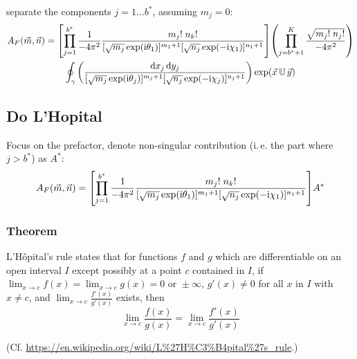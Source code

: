 \documentclass[
	english,
	a4paper,
	fontsize=10pt,
	parskip=half,
	titlepage=true,
	DIV=12,
	final
]{scrreprt}
\newcommand*{\ie}{i.\,e.\xspace}
\newcommand*{\iunit}{\ensuremath{\mathrm{i}}}
\begin{document}
separate the components $j=1 \ldots b^{*}$, assuming $m_j = 0$:
\begin{multline}
	A_F(\vec{m}, \vec{n})
=
	\qty[
		\prod_{j=1}^{b^*}
		\frac{1}{-4\pi^{2}}
		\frac
			{m_j! \; n_k!}
			{[\sqrt{m_j} \exp( \iunit \theta_1)]^{m_1 + 1}
			 [\sqrt{n_j} \exp(-\iunit \chi  _1)]^{n_1 + 1}
			}
	]
	\qty(
		\prod_{j=b^{*} + 1}^{K}
		\frac
			{\sqrt{m_j! \; n_j!}}
			{-4\pi^{2}}
	)
\\
	\oint_{\gamma}
		\qty(
			\frac
			{\dd{x_j} \dd{y_j}}
			{[\sqrt{m_j} \exp( \iunit \theta_j)]^{m_j+1}
			 [\sqrt{n_j} \exp(-\iunit \chi  _j)]^{n_j+1}}
		)
		\exp(\vec{x} \, \mathbb{U} \, \vec{y})
\end{multline}

\subsection{Do L'Hopital}
Focus on the prefactor, denote non-singular contribution (\ie the part where $j > b^{*}$) as $A^{*}$:
\begin{align}
	A_F(\vec{m}, \vec{n})
=
	\qty[
		\prod_{j=1}^{b^*}
		\frac{1}{-4\pi^{2}}
		\frac
			{m_j! \; n_k!}
			{[\sqrt{m_j} \exp( \iunit \theta_1)]^{m_1 + 1}
			 [\sqrt{n_j} \exp(-\iunit \chi  _1)]^{n_1 + 1}
			}
	] A^*
\end{align}

\subsubsection{Theorem}
\begin{displayquote}
L'Hôpital's rule states that for functions $f$ and $g$ which are differentiable on an open interval $I$ except possibly at a point $c$ contained in $I$, if 
$\lim _{x\to c}f(x)=\lim _{x\to c}g(x) = 0 \text{ or } \pm \infty$,
$g'(x) \neq 0$ for all $x$ in $I$ with $x \neq c$, and 
$\lim_{x \to c}
	\frac
		{f'(x)}
		{g'(x)}$ 
exists, then
\[
	\lim _{x\to c}{
		\frac 
			{f(x)}
			{g(x)}
	}
=
	\lim _{x\to c}{
		\frac
			{f'(x)}
			{g'(x)}
	}
\]
\end{displayquote}
(Cf. \url{https://en.wikipedia.org/wiki/L%27H%C3%B4pital%27s_rule}.)
\end{document}
